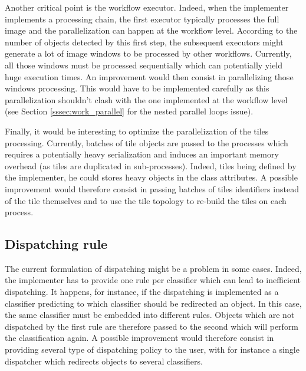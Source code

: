 Another critical point is the workflow executor. Indeed, when the implementer implements a processing chain, the first executor typically processes the full image and the parallelization can happen at the workflow level. According to the number of objects detected by this first step, the subsequent executors might generate a lot of image windows to be processed by other workflows. Currently, all those windows must be processed sequentially which can potentially yield huge execution times. An improvement would then consist in parallelizing those windows processing. This would have to be implemented carefully as this parallelization shouldn't clash with the one implemented at the workflow level (see Section \ref{sssec:work_parallel} for the nested parallel loops issue).

Finally, it would be interesting to optimize the parallelization of the tiles processing. Currently, batches of tile objects are passed to the processes which requires a potentially heavy serialization and induces an important memory overhead (as tiles are duplicated in sub-processes). Indeed, tiles being defined by the implementer, he could stores heavy objects in the class attributes. A possible improvement would therefore consist in passing batches of tiles identifiers instead of the tile themselves and to use the tile topology to re-build the tiles on each process. 

\subsection{Dispatching rule}
The current formulation of dispatching might be a problem in some cases. Indeed, the implementer has to provide one rule per classifier which can lead to inefficient dispatching. It happens, for instance, if the dispatching is implemented as a classifier predicting to which classifier should be redirected an object. In this case, the same classifier must be embedded into different rules. Objects which are not dispatched by the first rule are therefore passed to the second which will perform the classification again. A possible improvement would therefore consist in providing several type of dispatching policy to the user, with for instance a single dispatcher which redirects objects to several classifiers.

\label{sec:work_improvements}